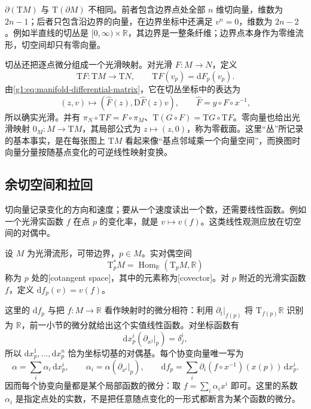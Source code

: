\(\partial(\mathrm{T}M)\) 与 \(\mathrm{T}(\partial M)\) 不相同。前者包含边界点处全部 \(n\) 维切向量，维数为 \(2n-1\)；后者只包含沿边界的向量，在边界坐标中还满足 \(v^n=0\)，维数为 \(2n-2\)。例如半直线的切丛是 \([0,\infty)\times\mathbb R\)，其边界是一整条纤维；边界点本身作为零维流形，切空间却只有零向量。

\ProseParagraphBreak

切丛还把逐点微分组成一个光滑映射。对光滑 \(F:M\to N\)，定义
\[
	\mathrm{T}F:\mathrm{T}M\longrightarrow \mathrm{T}N,\qquad \mathrm{T}F(v_p)=\mathrm{d}F_p(v_p).
\]
由\eqref{g1:eq:manifold-differential-matrix}，它在切丛坐标中的表达为
\[
	(z,v)\longmapsto(\widehat F(z),\mathrm{D}\widehat F(z)v),
	\qquad \widehat F=y\circ F\circ x^{-1},
\]
所以确实光滑。并有 \(\pi_N\circ \mathrm{T}F=F\circ\pi_M\)、\(\mathrm{T}(G\circ F)=\mathrm{T}G\circ \mathrm{T}F\)。零向量也给出光滑映射 \(0_M:M\to \mathrm{T}M\)，其局部公式为 \(z\mapsto(z,0)\)，称为零截面。这里“丛”所记录的基本事实，是在每张图上 \(\mathrm{T}M\) 看起来像“基点邻域乘一个向量空间”，而换图时向量分量按随基点变化的可逆线性映射变换。

\subsection{余切空间和拉回}
\label{g1:subsec:1102:04}

切向量记录变化的方向和速度；要从一个速度读出一个数，还需要线性函数。例如一个光滑实函数 \(f\) 在点 \(p\) 的变化率，就是 \(v\mapsto v(f)\)。这类线性观测应放在切空间的对偶中。

\begin{definition}
	\label{g1:def:cotangent-space}
	设 \(M\) 为光滑流形，可带边界，\(p\in M\)。实对偶空间
	\[
		\mathrm{T}_p^*M=\operatorname{Hom}_{\mathbb R}(\mathrm{T}_pM,\mathbb R)
	\]
	称为 \(p\) 处的[cotangent space]，其中的元素称为[covector]。对 \(p\) 附近的光滑实函数 \(f\)，定义 \(\mathrm{d}f_p(v)=v(f)\)。
\end{definition}

这里的 \(\mathrm{d}f_p\) 与把 \(f:M\to\mathbb R\) 看作映射时的微分相符：利用 \(\partial_t|_{f(p)}\) 将 \(\mathrm{T}_{f(p)}\mathbb R\) 识别为 \(\mathbb R\)，前一小节的微分就给出这个实值线性函数。对坐标函数有
\[
	\mathrm{d}x^i_p\left(\partial_{x^j}|_p\right)=\delta^i_j,
\]
所以 \(\mathrm{d}x^1_p,\ldots,\mathrm{d}x^n_p\) 恰为坐标切基的对偶基。每个协变向量唯一写为
\[
	\alpha=\sum_i\alpha_i\,\mathrm{d}x^i_p,\qquad
	\alpha_i=\alpha(\partial_{x^i}|_p),
	\qquad
	\mathrm{d}f_p=\sum_i\partial_i(f\circ x^{-1})(x(p))\,\mathrm{d}x^i_p.
\]
因而每个协变向量都是某个局部函数的微分：取 \(f=\sum_i\alpha_i x^i\) 即可。这里的系数 \(\alpha_i\) 是指定点处的实数，不是把任意随点变化的一形式都断言为某个函数的微分。

